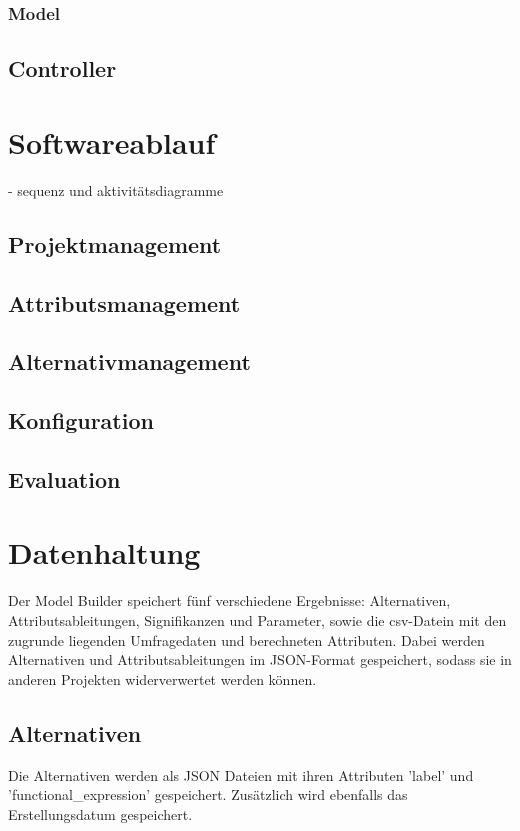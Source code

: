 \documentclass{article}
\begin{document}
\subsubsection{Model}
\subsection{Controller}

\section{Softwareablauf}
- sequenz und aktivitätsdiagramme
\subsection{Projektmanagement}
\subsection{Attributsmanagement}
\subsection{Alternativmanagement}
\subsection{Konfiguration}
\subsection{Evaluation}


\section{Datenhaltung}

Der Model Builder speichert fünf verschiedene Ergebnisse: Alternativen, Attributsableitungen, Signifikanzen und Parameter, sowie die csv-Datein mit den zugrunde liegenden Umfragedaten und berechneten Attributen. Dabei werden Alternativen und Attributsableitungen im JSON-Format gespeichert, sodass sie in anderen Projekten widerverwertet werden können.

\subsection{Alternativen}
Die Alternativen werden als JSON Dateien mit ihren Attributen 'label' und 'functional\_expression' gespeichert. Zusätzlich wird ebenfalls das Erstellungsdatum gespeichert.
\end{document}
